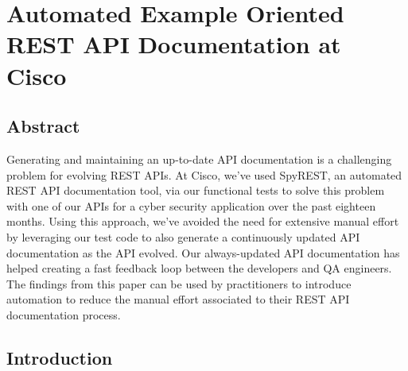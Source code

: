 \chapter{Automated Example Oriented REST API Documentation at Cisco}





\section{Abstract}
Generating and maintaining an up-to-date API documentation is a challenging problem for evolving REST APIs. At Cisco, we've used SpyREST, an automated REST API documentation tool, via our functional tests to solve this problem with one of our APIs for a cyber security application over the past eighteen months. Using this approach, we've avoided the need for extensive manual effort by leveraging our test code to also generate a continuously updated API documentation as the API evolved. Our always-updated API documentation has helped creating a fast feedback loop between the developers and QA engineers. The findings from this paper can be used by practitioners to introduce automation to reduce the manual effort associated to their REST API documentation process.





\section{Introduction}

